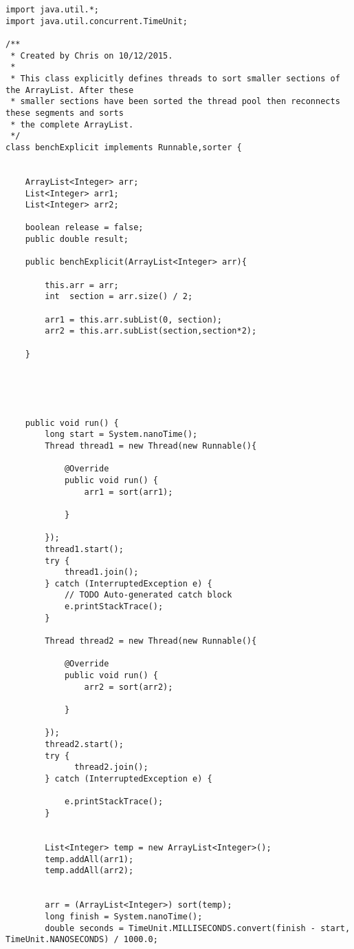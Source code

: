 \documentclass[11pt]{article}  %
\theoremstyle{definition}
\theoremstyle{remark}
\begin{document}
\begin{appendices}
\begin{lstlisting}
import java.util.*;
import java.util.concurrent.TimeUnit;

/**
 * Created by Chris on 10/12/2015.
 *
 * This class explicitly defines threads to sort smaller sections of the ArrayList. After these
 * smaller sections have been sorted the thread pool then reconnects these segments and sorts
 * the complete ArrayList.
 */
class benchExplicit implements Runnable,sorter {


    ArrayList<Integer> arr;
    List<Integer> arr1;
    List<Integer> arr2;

    boolean release = false;
    public double result;

    public benchExplicit(ArrayList<Integer> arr){

        this.arr = arr;
        int  section = arr.size() / 2;

        arr1 = this.arr.subList(0, section);
        arr2 = this.arr.subList(section,section*2);

    }





    public void run() {
        long start = System.nanoTime();
        Thread thread1 = new Thread(new Runnable(){

            @Override
            public void run() {
                arr1 = sort(arr1);

            }

        });
        thread1.start();
        try {
            thread1.join();
        } catch (InterruptedException e) {
            // TODO Auto-generated catch block
            e.printStackTrace();
        }

        Thread thread2 = new Thread(new Runnable(){

            @Override
            public void run() {
                arr2 = sort(arr2);

            }

        });
        thread2.start();
        try {
              thread2.join();
        } catch (InterruptedException e) {

            e.printStackTrace();
        }


        List<Integer> temp = new ArrayList<Integer>();
        temp.addAll(arr1);
        temp.addAll(arr2);


        arr = (ArrayList<Integer>) sort(temp);
        long finish = System.nanoTime();
        double seconds = TimeUnit.MILLISECONDS.convert(finish - start, TimeUnit.NANOSECONDS) / 1000.0;


\end{lstlisting}
\end{appendices}
\end{document}

